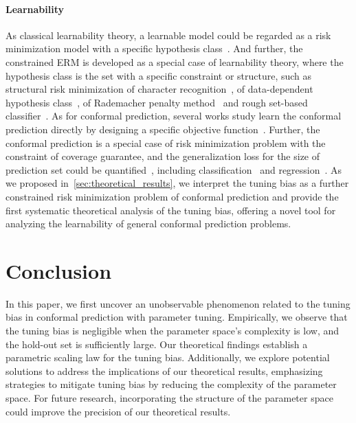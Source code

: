 \documentclass{article}
\newcommand{\1}{\mathbbm{1}}
\theoremstyle{plain}
\theoremstyle{definition}
\theoremstyle{remark}
\begin{document}
\paragraph{Learnability}
As classical learnability theory, a learnable model could be regarded as a risk minimization model with a specific hypothesis class~\citep{vapnik1971uniform,vapnik1991principles,vandervaart1996weak, vapnik1999overview, vershynin2018highdimensional}.
And further, the constrained ERM is developed as a special case of learnability theory, where the hypothesis class is the set with a specific constraint or structure, such as structural risk minimization of character recognition~\citep{guyon1991structural}, of data-dependent hypothesis class~\citep{shawe-taylor1998structural}, of Rademacher penalty method~\citep{koltchinskii2001rademacher} and rough set-based classifier~\citep{liu2020structural}.
As for conformal prediction, several works study learn the conformal prediction directly by designing a specific objective function~\citep{stutz2022learning, noorani2024conformal}. 
Further, the conformal prediction is a special case of risk minimization problem with the constraint of coverage guarantee, and the generalization loss for the size of prediction set could be quantified~\citep{gupta2022nested, yang2024selection}, including classification~\citep{bai2022efficient} and regression~\citep{gupta2022nested, fan2024utopia}.
As we proposed in~\cref{sec:theoretical_results}, we interpret the tuning bias as a further constrained risk minimization problem of conformal prediction and provide the first systematic theoretical analysis of the tuning bias, offering a novel tool for analyzing the learnability of general conformal prediction problems.

\section{Conclusion}
\label{sec:conclusion}
In this paper, we first uncover an unobservable phenomenon related to the tuning bias in conformal prediction with parameter tuning. 
Empirically, we observe that the tuning bias is negligible when the parameter space's complexity is low, and the hold-out set is sufficiently large. 
Our theoretical findings establish a parametric scaling law for the tuning bias. 
Additionally, we explore potential solutions to address the implications of our theoretical results, emphasizing strategies to mitigate tuning bias by reducing the complexity of the parameter space.
For future research, incorporating the structure of the parameter space could improve the precision of our theoretical results.
\end{document}
